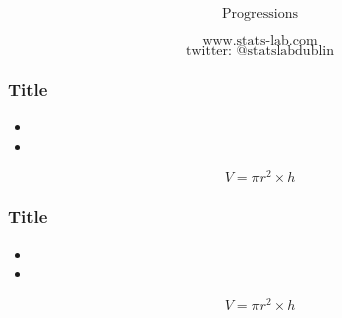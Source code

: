 \documentclass{beamer}
\begin{document}
\begin{frame}

{
\Huge
\[\mbox{Progressions} \]
}
{
\Large

\[\mbox{www.stats-lab.com} \]
\[ \mbox{twitter: @statslabdublin} \] 

}
\end{frame}
\begin{frame}
\frametitle{Title}
{
\Large
\begin{itemize}
\item
\item
\end{itemize}
}
{
\Huge
\[V = \pi r^2  \times h \]
}
\end{frame}

\begin{frame}
\frametitle{Title}
{
\Large
\begin{itemize}
\item
\item
\end{itemize}
}
{
\Huge
\[V = \pi r^2  \times h \]
}
\end{frame}
\end{document}
